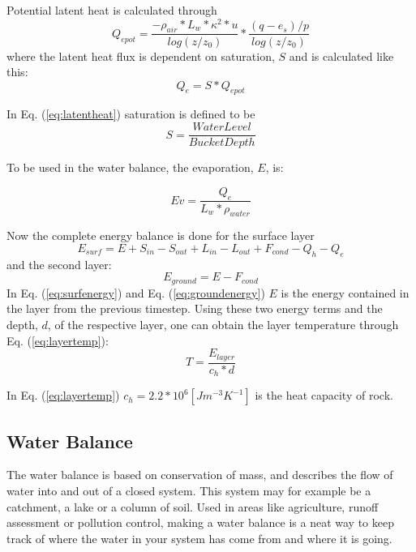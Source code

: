 \documentclass[a4paper,11pt,twocolumn]{article}
\begin{document}
Potential latent heat is calculated through 
\begin{equation}
Q_{e pot} = \frac{-\rho_{air}*L_w*\kappa^2*u}{log(z/z_0)}*\frac{(q-e_s)/p}{log(z/z_0)}
\end{equation}
where the latent heat flux is dependent on saturation, $S$ and is calculated like this:
\begin{equation}
Q_e = S*Q_{e pot}
\label{eq:latentheat}
\end{equation}

In Eq. (\ref{eq:latentheat}) saturation is defined to be
\begin{equation}
S = \frac{Water Level}{Bucket Depth}
\end{equation}

To be used in the water balance, the evaporation, $E$, is: 

\begin{equation}
Ev = \frac{Q_e}{L_w*\rho_{water}}
\end{equation}

Now the complete energy balance is done for the surface layer  
\begin{equation}
	E_{surf} = E + S_{in}-S_{out}+L_{in}-L_{out}+F_{cond}-Q_h-Q_e
	\label{eq:surfenergy}
\end{equation}
and the second layer:
\begin{equation}
E_{ground} = E-F_{cond}
	\label{eq:groundenergy}
\end{equation}
In Eq. (\ref{eq:surfenergy}) and Eq. (\ref{eq:groundenergy}) $E$ is the energy contained in the layer from the previous timestep. Using these two energy terms and the depth, $d$, of the respective layer, one can obtain the layer temperature through Eq. (\ref{eq:layertemp}):
\begin{equation}
	T = \frac{E_{layer}}{c_h*d}
	\label{eq:layertemp}
\end{equation}

In Eq. (\ref{eq:layertemp}) $c_h = 2.2*10^6 [Jm^{-3}K^{-1}]$ is the heat capacity of rock.  


\subsection{Water Balance}
The water balance is based on conservation of mass, and describes the flow of water into and out of a closed system. This system may for example be a catchment, a lake or a column of soil. Used in areas like agriculture, runoff assessment or pollution control, making a water balance is a neat way to keep track of where the water in your system has come from and where it is going. 
\end{document}

